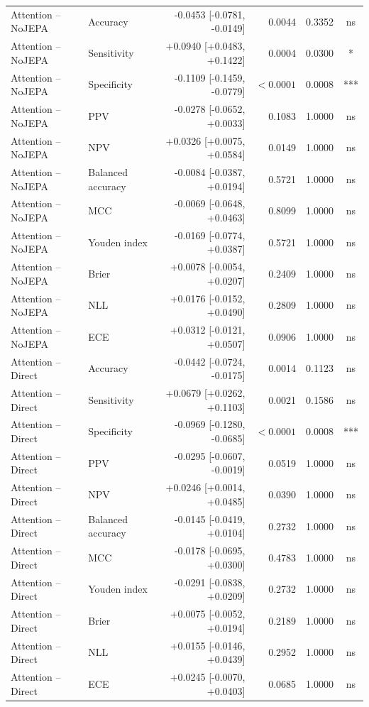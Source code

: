 \begin{table}[t]
\begin{tabular}{llrrrc}
Attention -- NoJEPA & Accuracy & -0.0453 [-0.0781, -0.0149] & 0.0044 & 0.3352 & ns \\
Attention -- NoJEPA & Sensitivity & +0.0940 [+0.0483, +0.1422] & 0.0004 & 0.0300 & * \\
Attention -- NoJEPA & Specificity & -0.1109 [-0.1459, -0.0779] & $<0.0001$ & 0.0008 & *** \\
Attention -- NoJEPA & PPV & -0.0278 [-0.0652, +0.0033] & 0.1083 & 1.0000 & ns \\
Attention -- NoJEPA & NPV & +0.0326 [+0.0075, +0.0584] & 0.0149 & 1.0000 & ns \\
Attention -- NoJEPA & Balanced accuracy & -0.0084 [-0.0387, +0.0194] & 0.5721 & 1.0000 & ns \\
Attention -- NoJEPA & MCC & -0.0069 [-0.0648, +0.0463] & 0.8099 & 1.0000 & ns \\
Attention -- NoJEPA & Youden index & -0.0169 [-0.0774, +0.0387] & 0.5721 & 1.0000 & ns \\
Attention -- NoJEPA & Brier & +0.0078 [-0.0054, +0.0207] & 0.2409 & 1.0000 & ns \\
Attention -- NoJEPA & NLL & +0.0176 [-0.0152, +0.0490] & 0.2809 & 1.0000 & ns \\
Attention -- NoJEPA & ECE & +0.0312 [-0.0121, +0.0507] & 0.0906 & 1.0000 & ns \\
Attention -- Direct & Accuracy & -0.0442 [-0.0724, -0.0175] & 0.0014 & 0.1123 & ns \\
Attention -- Direct & Sensitivity & +0.0679 [+0.0262, +0.1103] & 0.0021 & 0.1586 & ns \\
Attention -- Direct & Specificity & -0.0969 [-0.1280, -0.0685] & $<0.0001$ & 0.0008 & *** \\
Attention -- Direct & PPV & -0.0295 [-0.0607, -0.0019] & 0.0519 & 1.0000 & ns \\
Attention -- Direct & NPV & +0.0246 [+0.0014, +0.0485] & 0.0390 & 1.0000 & ns \\
Attention -- Direct & Balanced accuracy & -0.0145 [-0.0419, +0.0104] & 0.2732 & 1.0000 & ns \\
Attention -- Direct & MCC & -0.0178 [-0.0695, +0.0300] & 0.4783 & 1.0000 & ns \\
Attention -- Direct & Youden index & -0.0291 [-0.0838, +0.0209] & 0.2732 & 1.0000 & ns \\
Attention -- Direct & Brier & +0.0075 [-0.0052, +0.0194] & 0.2189 & 1.0000 & ns \\
Attention -- Direct & NLL & +0.0155 [-0.0146, +0.0439] & 0.2952 & 1.0000 & ns \\
Attention -- Direct & ECE & +0.0245 [-0.0070, +0.0403] & 0.0685 & 1.0000 & ns \\
\bottomrule
\end{tabular}
\end{table}

